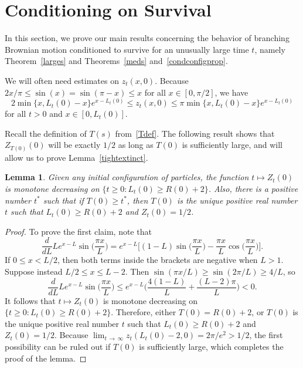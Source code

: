 \documentclass[10pt]{amsart}
\newtheorem{lemm}[theo]{Lemma}\newtheorem{prop}[theo]{Proposition}\newtheorem{coro}[theo]{Corollary}\newtheorem{conj}[theo]{Conjecture}
\theoremstyle{definition}\newtheorem{defi}[theo]{Definition}\newtheorem{rema}[theo]{Remark}\newtheorem{exam}[theo]{Example}\newtheorem{exem}[theo]{Example}\newtheorem{nota}[theo]{Notation}
\newcommand{\1} {\mathds{1}}
\begin{document}
\section{Conditioning on Survival}\label{18sec}

In this section, we prove our main results concerning the behavior of branching Brownian motion conditioned to survive for an unusually large time $t$, namely Theorem~\ref{larges} and Theorems~\ref{meds} and~\ref{condconfigprop}.

We will often need estimates on $z_t(x,0)$. Because $2x/\pi \leq \sin(x) = \sin(\pi - x) \leq x$ for all $x \in [0, \pi/2]$, we have
\begin{equation}\label{detzbound}
2 \min\{x, L_t(0) - x\} e^{x - L_t(0)} \leq z_t(x,0) \leq \pi \min\{x, L_t(0) - x\} e^{x - L_t(0)}
\end{equation}
for all $t > 0$ and $x \in [0, L_t(0)]$.

Recall the definition of $T(s)$ from~\eqref{Tdef}. The following result shows that $Z_{T(0)}(0)$ will be exactly $1/2$ as long as $T(0)$ is sufficiently large, and will allow us to prove Lemma~\ref{tightextinct}.

\begin{lemm}\label{monotone}
Given any initial configuration of particles, the function $t \mapsto Z_t(0)$ is monotone decreasing on $\{t\ge0:L_t(0) \ge R(0) + 2\}$. Also, there is a positive number $t^*$ such that if $T(0) \geq t^*$, then $T(0)$ is the unique positive real number $t$ such that $L_t(0) \geq R(0) + 2$ and $Z_t(0) = 1/2$.
\end{lemm}

\begin{proof}
To prove the first claim, note that
\[
\frac{d}{dL} L e^{x-L} \sin \bigg(\frac{\pi x}{L} \bigg) = e^{x-L} \bigg[(1 - L) \sin \bigg(\frac{\pi x}{L} \bigg) - \frac{\pi x}{L} \cos \bigg(\frac{\pi x}{L} \bigg) \bigg].
\]
If $0 \leq x < L/2$, then both terms inside the brackets are negative when $L > 1$. Suppose instead $L/2 \leq x \leq L - 2$. Then $\sin(\pi x/L) \geq \sin(2 \pi/L) \geq 4/L$, so
\[
\frac{d}{dL} L e^{x-L} \sin \bigg(\frac{\pi x}{L} \bigg) \leq e^{x-L} \bigg(\frac{4 (1 - L)}{L} + \frac{(L-2) \pi}{L} \bigg) < 0.
\]
It follows that $t \mapsto Z_t(0)$ is monotone decreasing on $\{t\ge0:L_t(0) \ge R(0) + 2\}$. Therefore, either $T(0) = R(0) + 2$, or $T(0)$ is the unique positive real number $t$ such that $L_t(0) \geq R(0) + 2$ and $Z_t(0) = 1/2$. Because $\lim_{t\, \rightarrow\,\infty} z_t(L_t(0) - 2, 0) = 2 \pi/e^2 > 1/2$, the first possibility can be ruled out if $T(0)$ is sufficiently large, which completes the proof of the lemma.
\end{proof}
\end{document}
